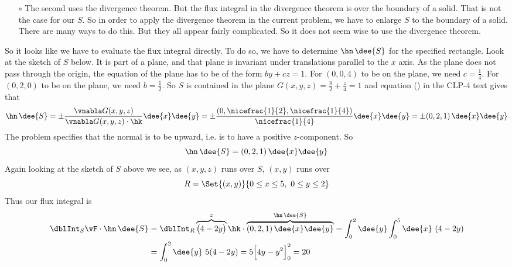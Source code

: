 \begin{solution}
\begin{itemize}
\item[$\circ$] The second uses the divergence theorem. But the flux
integral in the divergence theorem is over the boundary of a solid.
That is not the case for our $S$. So in order to apply the divergence theorem
in the current problem, we have to enlarge $S$ to the boundary of
a solid. There are many ways to do this. But they all appear
fairly complicated. So it does not seem wise to use the divergence theorem.
\end{itemize}
So it looks like we have to evaluate the flux integral directly.
To do so, we have to determine $\hn\,\dee{S}$ for the specified rectangle.
Look at the sketch of $S$ below. It is part of a plane,
and that plane is invariant under translations parallel to the
$x$ axis. As the plane does not pass through the origin, the equation
of the plane has to be of the form $by+cz=1$. For $(0,0,4)$ to be on the plane,
we need $c=\frac{1}{4}$. For $(0,2,0)$ to be on the plane, we need
$b=\frac{1}{2}$. So $S$ is contained in the plane 
$G(x,y,z) = \frac{y}{2} +\frac{z}{4} =1$ and 
equation () in the CLP-4 text gives that
\begin{equation*}
\hn\,\dee{S} = \pm\frac{\vnabla G(x,y,z)}{\vnabla G(x,y,z)\cdot\hk}
                       \dee{x}\dee{y}
=\pm \frac{(0,\nicefrac{1}{2},\nicefrac{1}{4})}{\nicefrac{1}{4}} \dee{x}\dee{y}
=\pm (0,2,1)\, \dee{x}\dee{y}
\end{equation*}
The problem specifies that the normal is to be upward, i.e. is to have
a positive $z$-component. So
\begin{equation*}
\hn\,\dee{S} = (0,2,1)\,\dee{x}\dee{y}
\end{equation*}
Again looking at the sketch of $S$ above we see, as $(x,y,z)$ runs over $S$, $(x,y)$ runs over
\begin{equation*}
R = \Set{(x,y)}{0\le x\le 5,\ 0\le y\le 2}
\end{equation*}
Thus our flux integral is
\begin{align*}
\dblInt_S \vF \cdot \hn\,\dee{S}
&=\dblInt_R \overbrace{\big(4-2y\big)}^{z}\hk\cdot 
           \overbrace{(0,2,1)\,\dee{x}\dee{y}}^{\hn\,\dee{S}}
=\int_0^2\dee{y}\int_0^5\dee{x}\ (4-2y) \\
&= \int_0^2\dee{y}\ 5(4-2y)
=5\Big[4y-y^2\Big]_0^2
=20
\end{align*}




\end{solution}
